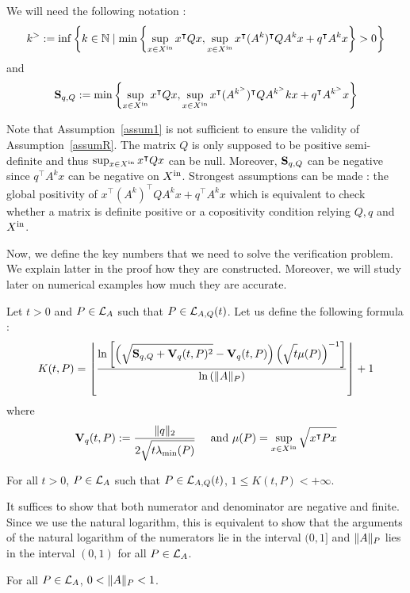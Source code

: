 \documentclass[10pt]{article}
\begin{document}
We will need the following notation :
\[
k^{>}:=\inf\left\{k\in\mathbb{N}\mid \min\left\{\sup_{x\in X^\mathrm{in}} x^\intercal Q x , \sup_{x\in X^\mathrm{in}} x^\intercal (A^k)^\intercal Q A^k x+q^\intercal A^k x\right\}>0\right\}
\]
and
\[
\mathbf{S}_{q,Q}:= \min\left\{\sup_{x\in X^\mathrm{in}} x^\intercal Q x , \sup_{x\in X^\mathrm{in}} x^\intercal (A^{k^{>}})^\intercal Q A^{k^{>}}k x+q^\intercal A^{k^{>}}x\right\}
\]

Note that Assumption~\ref{assum1} is not sufficient to ensure the validity of Assumption~\ref{assumR}. The matrix $Q$ is only supposed to be positive semi-definite and thus $\sup_{x\in X^\mathrm{in}} x^\intercal Q x$ can be null. Moreover, $\mathbf{S}_{q,Q}$ can be negative since $q^\intercal A^k x$ can be negative on $X^\mathrm{in}$. Strongest assumptions can be made : the global positivity of $x^\intercal (A^k)^\intercal  Q A^k x+q^\intercal A^k x$ which is equivalent to check whether a matrix is definite positive or a copositivity condition relying $Q,q$ and $X^\mathrm{in}$. 

Now, we define the key numbers that we need to solve the verification problem. We explain latter in the proof how they are constructed. Moreover, we will study later on numerical examples how much they are accurate.  


Let $t>0$ and $P\in\mathcal{L}_{A}$ such that $P\in \mathcal{L}_{A,Q}(t)$. Let us define the following formula :
\begin{equation}
\label{intgfond}
K(t,P)=\left\lfloor \dfrac{\ln\left[\left(\sqrt{\strut \mathbf{S}_{q,Q}+\mathbf{V}_{q}(t,P)^2}-\mathbf{V}_{q}(t,P)\right)\left(\sqrt{\strut t}\mu(P)\right)^{-1}\right]}{\ln\left(\| A\|_P\right)}\right\rfloor+1
\end{equation}
where 
\[
\mathbf{V}_{q}(t,P):=\dfrac{\| q\|_2 }{2\sqrt{\strut t\lambda_{\operatorname{min}}(P)}}\quad \text{ and } \mu(P)=\sup_{x\in X^\mathrm{in}} \sqrt{\strut x^\intercal P x}
\]


\begin{prop}
For all $t>0$, $P\in \mathcal{L}_{A}$ such that $P\in \mathcal{L}_{A,Q}(t)$, $1\leq K(t,P)< +\infty$.  
\end{prop}

It suffices to show that both numerator and denominator are negative and finite. Since we use the natural logarithm, this is equivalent to show that the arguments of the natural logarithm of the numerators lie in the interval $(0,1]$ and $\| A\|_P$ lies in the interval $(0,1)$ for all $P\in\mathcal{L}_{A}$. 

\begin{lemma}
\label{lyapnorm}
For all $P\in\mathcal{L}_{A}$, $0<\| A\|_P<1$. 
\end{lemma}
\end{document}

